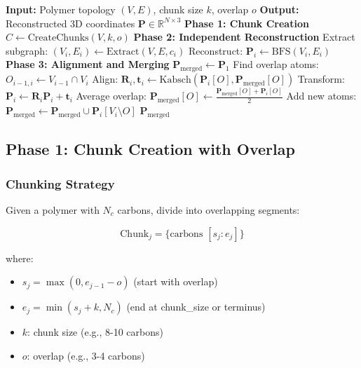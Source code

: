 \documentclass[11pt,a4paper]{article}
\begin{document}
\begin{algorithm}
\caption{Chunk-Based Reconstruction with Overlap Merging}
\begin{algorithmic}[1]
\State \textbf{Input:} Polymer topology $(V, E)$, chunk size $k$, overlap $o$
\State \textbf{Output:} Reconstructed 3D coordinates $\mathbf{P} \in \mathbb{R}^{N \times 3}$
\State
\State \textbf{Phase 1: Chunk Creation}
\State $C \gets \text{CreateChunks}(V, k, o)$ 
\State
\State \textbf{Phase 2: Independent Reconstruction}
    \State Extract subgraph: $(V_i, E_i) \gets \text{Extract}(V, E, c_i)$
    \State Reconstruct: $\mathbf{P}_i \gets \text{BFS}(V_i, E_i)$ 
\EndFor
\State
\State \textbf{Phase 3: Alignment and Merging}
\State $\mathbf{P}_{\text{merged}} \gets \mathbf{P}_1$ 
    \State Find overlap atoms: $O_{i-1,i} \gets V_{i-1} \cap V_i$
    \State Align: $\mathbf{R}_i, \mathbf{t}_i \gets \text{Kabsch}(\mathbf{P}_i[O], \mathbf{P}_{\text{merged}}[O])$
    \State Transform: $\mathbf{P}_i \gets \mathbf{R}_i \mathbf{P}_i + \mathbf{t}_i$
    \State Average overlap: $\mathbf{P}_{\text{merged}}[O] \gets \frac{\mathbf{P}_{\text{merged}}[O] + \mathbf{P}_i[O]}{2}$
    \State Add new atoms: $\mathbf{P}_{\text{merged}} \gets \mathbf{P}_{\text{merged}} \cup \mathbf{P}_i[V_i \setminus O]$
\EndFor
\State
\State \Return $\mathbf{P}_{\text{merged}}$
\end{algorithmic}
\end{algorithm}

\subsection{Phase 1: Chunk Creation with Overlap}

\subsubsection{Chunking Strategy}

Given a polymer with $N_c$ carbons, divide into overlapping segments:

\begin{equation}
\text{Chunk}_j = \{\text{carbons } [s_j : e_j]\}
\end{equation}

where:
\begin{itemize}
    \item $s_j = \max(0, e_{j-1} - o)$ (start with overlap)
    \item $e_j = \min(s_j + k, N_c)$ (end at chunk\_size or terminus)
    \item $k$: chunk size (e.g., 8-10 carbons)
    \item $o$: overlap (e.g., 3-4 carbons)
\end{itemize}
\end{document}
